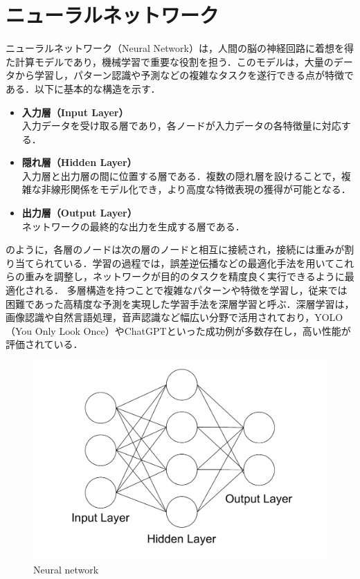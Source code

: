 
\section{ニューラルネットワーク}
ニューラルネットワーク（Neural Network）は，人間の脳の神経回路に着想を得た計算モデルであり，機械学習で重要な役割を担う．このモデルは，大量のデータから学習し，パターン認識や予測などの複雑なタスクを遂行できる点が特徴である．以下に基本的な構造を示す．


\begin{itemize}
     \item \textbf{入力層（Input Layer）}\\
     入力データを受け取る層であり，各ノードが入力データの各特徴量に対応する．
     \item \textbf{隠れ層（Hidden Layer）}\\
     入力層と出力層の間に位置する層である．複数の隠れ層を設けることで，複雑な非線形関係をモデル化でき，より高度な特徴表現の獲得が可能となる．
     \item \textbf{出力層（Output Layer）}\\
     ネットワークの最終的な出力を生成する層である．
\end{itemize}

のように，各層のノードは次の層のノードと相互に接続され，接続には重みが割り当てられている．学習の過程では，誤差逆伝播などの最適化手法を用いてこれらの重みを調整し，ネットワークが目的のタスクを精度良く実行できるように最適化される．
多層構造を持つことで複雑なパターンや特徴を学習し，従来では困難であった高精度な予測を実現した学習手法を深層学習と呼ぶ．深層学習は，画像認識や自然言語処理，音声認識など幅広い分野で活用されており，YOLO（You Only Look Once）\cite{redmon2016you-yolo}やChatGPT\cite{radford2018improving-gpt, radford2019language-gpt,brown2020language-gpt}といった成功例が多数存在し，高い性能が評価されている．


\begin{figure}[H]
     \centering
    \includegraphics[keepaspectratio, scale=0.37]
         {images/neural-network.pdf}
    \caption{Neural network}
    \label{Fig:neural-network}
\end{figure}   

\newpage
